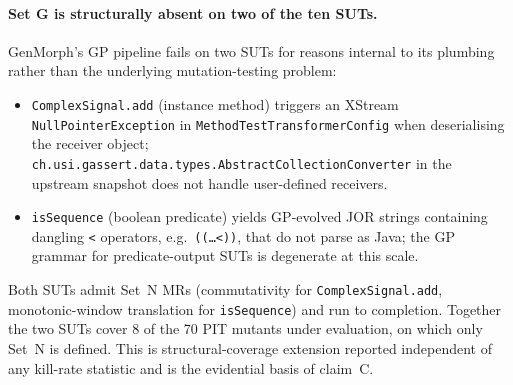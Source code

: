 \paragraph{Set G is structurally absent on two of the ten SUTs.}
\label{para:set-g-na}
GenMorph's GP pipeline fails on two SUTs for reasons internal to its
plumbing rather than the underlying mutation-testing problem:
\begin{itemize}[nosep,leftmargin=*]
  \item \texttt{ComplexSignal.add} (instance method) triggers an
        XStream \texttt{NullPointerException} in
        \texttt{MethodTestTransformerConfig} when deserialising the
        receiver object;
        \texttt{ch.usi.gassert.data.types.AbstractCollectionConverter}
        in the upstream snapshot does not handle user-defined
        receivers.
  \item \texttt{isSequence} (boolean predicate) yields GP-evolved JOR
        strings containing dangling \texttt{<} operators, e.g.\
        \texttt{((\ldots <))}, that do not parse as Java; the GP
        grammar for predicate-output SUTs is degenerate at this scale.
\end{itemize}
Both SUTs admit Set~N MRs (commutativity for
\texttt{ComplexSignal.add}, monotonic-window translation for
\texttt{isSequence}) and run to completion. Together the two SUTs
cover 8 of the 70 PIT mutants under evaluation, on which only Set~N
is defined. This is structural-coverage extension reported
independent of any kill-rate statistic and is the evidential basis of
claim~C.

